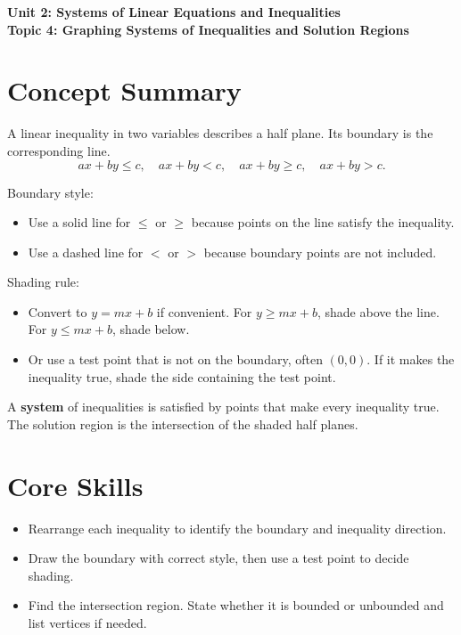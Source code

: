 \documentclass[14pt]{extarticle}
\begin{document}
\raggedright
{}

\begin{center}
    \LARGE \textbf{Unit 2: Systems of Linear Equations and Inequalities} \\[6pt]
    \Large \textbf{Topic 4: Graphing Systems of Inequalities and Solution Regions}
\end{center}

\vspace{1em}

\section*{Concept Summary}

A linear inequality in two variables describes a half plane. Its boundary is the corresponding line.  
\[
ax + by \le c,\quad ax + by < c,\quad ax + by \ge c,\quad ax + by > c.
\]

Boundary style:
\begin{itemize}
    \item Use a solid line for \(\le\) or \(\ge\) because points on the line satisfy the inequality.
    \item Use a dashed line for \(<\) or \(>\) because boundary points are not included.
\end{itemize}

Shading rule:
\begin{itemize}
    \item Convert to \(y = mx + b\) if convenient. For \(y \ge mx + b\), shade above the line. For \(y \le mx + b\), shade below.
    \item Or use a test point that is not on the boundary, often \((0,0)\). If it makes the inequality true, shade the side containing the test point.
\end{itemize}

A \textbf{system} of inequalities is satisfied by points that make every inequality true. The solution region is the intersection of the shaded half planes.

\section*{Core Skills}
\begin{itemize}
    \item Rearrange each inequality to identify the boundary and inequality direction.
    \item Draw the boundary with correct style, then use a test point to decide shading.
    \item Find the intersection region. State whether it is bounded or unbounded and list vertices if needed.
\end{itemize}
\end{document}
